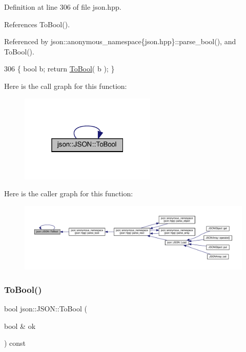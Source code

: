 Definition at line 306 of file json.\+hpp.



References To\+Bool().



Referenced by json\+::anonymous\+\_\+namespace\{json.\+hpp\}\+::parse\+\_\+bool(), and To\+Bool().


\begin{DoxyCode}
306 \{ \textcolor{keywordtype}{bool} b; \textcolor{keywordflow}{return} \mbox{\hyperlink{classjson_1_1_j_s_o_n_adb9ab4683ee30055912b47220780de16}{ToBool}}( b ); \}
\end{DoxyCode}
Here is the call graph for this function\+:
\nopagebreak
\begin{figure}[H]
\begin{center}
\leavevmode
\includegraphics[width=184pt]{classjson_1_1_j_s_o_n_adb9ab4683ee30055912b47220780de16_cgraph}
\end{center}
\end{figure}
Here is the caller graph for this function\+:
\nopagebreak
\begin{figure}[H]
\begin{center}
\leavevmode
\includegraphics[width=350pt]{classjson_1_1_j_s_o_n_adb9ab4683ee30055912b47220780de16_icgraph}
\end{center}
\end{figure}
\mbox{\label{classjson_1_1_j_s_o_n_aa86f03b8572b13dd768c902da2d83efa}} 
\subsubsection{\texorpdfstring{To\+Bool()}{ToBool()}\hspace{0.1cm}{\footnotesize\ttfamily [2/2]}}
{\footnotesize\ttfamily bool json\+::\+J\+S\+O\+N\+::\+To\+Bool (\begin{DoxyParamCaption}\item[{bool \&}]{ok }\end{DoxyParamCaption}) const\hspace{0.3cm}{\ttfamily [inline]}}



